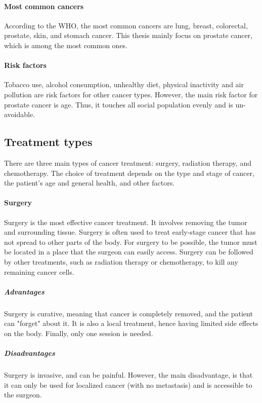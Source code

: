 \paragraph{Most common cancers}
According to the WHO, the most common cancers are lung, breast, colorectal, prostate, skin, and stomach cancer.
This thesis mainly focus on prostate cancer, which is among the most common ones.

\paragraph{Risk factors}
Tobacco use, alcohol consumption, unhealthy diet, physical inactivity and air pollution are risk factors for other cancer types.
However, the main risk factor for prostate cancer is age.
Thus, it touches all social population evenly and is un-avoidable.

\subsection{Treatment types}

There are three main types of cancer treatment: surgery, radiation therapy, and chemotherapy.
The choice of treatment depends on the type and stage of cancer, the patient's age and general health, and other factors.

\paragraph{Surgery}
Surgery is the most effective cancer treatment.
It involves removing the tumor and surrounding tissue.
Surgery is often used to treat early-stage cancer that has not spread to other parts of the body.
For surgery to be possible, the tumor must be located in a place that the surgeon can easily access.
Surgery can be followed by other treatments, such as radiation therapy or chemotherapy, to kill any remaining cancer cells.

\subparagraph{Advantages}
Surgery is curative, meaning that cancer is completely removed, and the patient can "forget" about it.
It is also a local treatment, hence having limited side effects on the body.
Finally, only one session is needed.

\subparagraph{Disadvantages}
Surgery is invasive, and can be painful.
However, the main disadvantage, is that it can only be used for localized cancer (with no metastasis) and is accessible to the surgeon.

